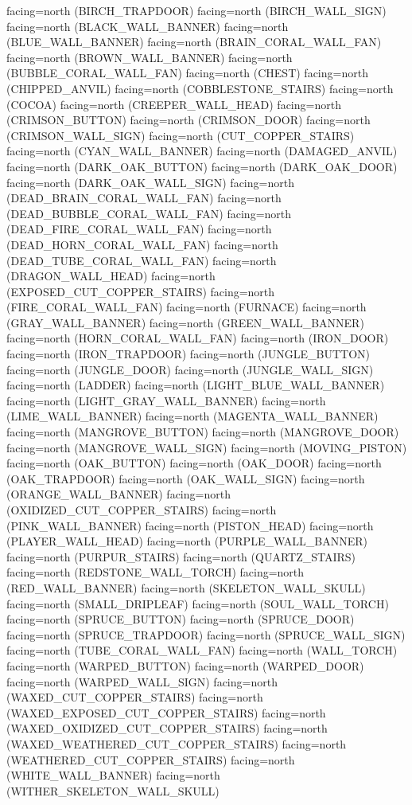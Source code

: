 \documentclass[11pt]{article}
\begin{document}
facing=north (BIRCH_TRAPDOOR)
facing=north (BIRCH_WALL_SIGN)
facing=north (BLACK_WALL_BANNER)
facing=north (BLUE_WALL_BANNER)
facing=north (BRAIN_CORAL_WALL_FAN)
facing=north (BROWN_WALL_BANNER)
facing=north (BUBBLE_CORAL_WALL_FAN)
facing=north (CHEST)
facing=north (CHIPPED_ANVIL)
facing=north (COBBLESTONE_STAIRS)
facing=north (COCOA)
facing=north (CREEPER_WALL_HEAD)
facing=north (CRIMSON_BUTTON)
facing=north (CRIMSON_DOOR)
facing=north (CRIMSON_WALL_SIGN)
facing=north (CUT_COPPER_STAIRS)
facing=north (CYAN_WALL_BANNER)
facing=north (DAMAGED_ANVIL)
facing=north (DARK_OAK_BUTTON)
facing=north (DARK_OAK_DOOR)
facing=north (DARK_OAK_WALL_SIGN)
facing=north (DEAD_BRAIN_CORAL_WALL_FAN)
facing=north (DEAD_BUBBLE_CORAL_WALL_FAN)
facing=north (DEAD_FIRE_CORAL_WALL_FAN)
facing=north (DEAD_HORN_CORAL_WALL_FAN)
facing=north (DEAD_TUBE_CORAL_WALL_FAN)
facing=north (DRAGON_WALL_HEAD)
facing=north (EXPOSED_CUT_COPPER_STAIRS)
facing=north (FIRE_CORAL_WALL_FAN)
facing=north (FURNACE)
facing=north (GRAY_WALL_BANNER)
facing=north (GREEN_WALL_BANNER)
facing=north (HORN_CORAL_WALL_FAN)
facing=north (IRON_DOOR)
facing=north (IRON_TRAPDOOR)
facing=north (JUNGLE_BUTTON)
facing=north (JUNGLE_DOOR)
facing=north (JUNGLE_WALL_SIGN)
facing=north (LADDER)
facing=north (LIGHT_BLUE_WALL_BANNER)
facing=north (LIGHT_GRAY_WALL_BANNER)
facing=north (LIME_WALL_BANNER)
facing=north (MAGENTA_WALL_BANNER)
facing=north (MANGROVE_BUTTON)
facing=north (MANGROVE_DOOR)
facing=north (MANGROVE_WALL_SIGN)
facing=north (MOVING_PISTON)
facing=north (OAK_BUTTON)
facing=north (OAK_DOOR)
facing=north (OAK_TRAPDOOR)
facing=north (OAK_WALL_SIGN)
facing=north (ORANGE_WALL_BANNER)
facing=north (OXIDIZED_CUT_COPPER_STAIRS)
facing=north (PINK_WALL_BANNER)
facing=north (PISTON_HEAD)
facing=north (PLAYER_WALL_HEAD)
facing=north (PURPLE_WALL_BANNER)
facing=north (PURPUR_STAIRS)
facing=north (QUARTZ_STAIRS)
facing=north (REDSTONE_WALL_TORCH)
facing=north (RED_WALL_BANNER)
facing=north (SKELETON_WALL_SKULL)
facing=north (SMALL_DRIPLEAF)
facing=north (SOUL_WALL_TORCH)
facing=north (SPRUCE_BUTTON)
facing=north (SPRUCE_DOOR)
facing=north (SPRUCE_TRAPDOOR)
facing=north (SPRUCE_WALL_SIGN)
facing=north (TUBE_CORAL_WALL_FAN)
facing=north (WALL_TORCH)
facing=north (WARPED_BUTTON)
facing=north (WARPED_DOOR)
facing=north (WARPED_WALL_SIGN)
facing=north (WAXED_CUT_COPPER_STAIRS)
facing=north (WAXED_EXPOSED_CUT_COPPER_STAIRS)
facing=north (WAXED_OXIDIZED_CUT_COPPER_STAIRS)
facing=north (WAXED_WEATHERED_CUT_COPPER_STAIRS)
facing=north (WEATHERED_CUT_COPPER_STAIRS)
facing=north (WHITE_WALL_BANNER)
facing=north (WITHER_SKELETON_WALL_SKULL)
\end{document}
